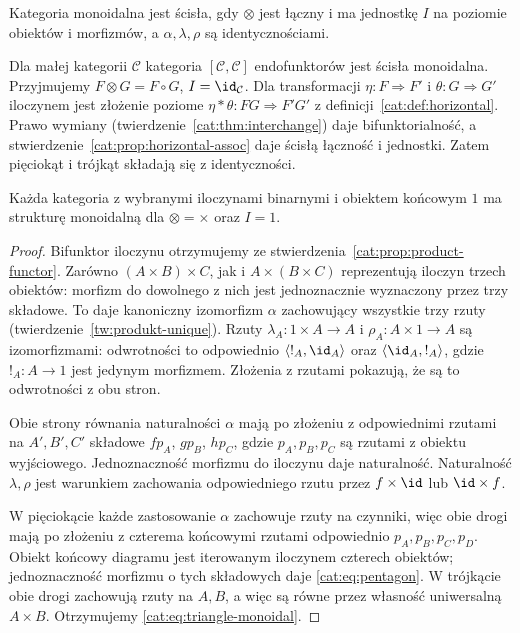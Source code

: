 \begin{definicja}\label{cat:def:strict-monoidal}
Kategoria monoidalna jest ścisła, gdy $\otimes$ jest łączny i ma jednostkę $I$ na poziomie obiektów i morfizmów, a $\alpha,\lambda,\rho$ są identycznościami.
\end{definicja}

\begin{przyklad}\label{cat:ex:endofunctor-monoidal}
Dla małej kategorii $\mathcal C$ kategoria $[\mathcal C,\mathcal C]$ endofunktorów jest ścisła monoidalna. Przyjmujemy $F\otimes G=F\circ G$, $I=\id_{\mathcal C}$. Dla transformacji $\eta:F\Rightarrow F'$ i $\theta:G\Rightarrow G'$ iloczynem jest złożenie poziome $\eta\ast\theta:FG\Rightarrow F'G'$ z definicji~\ref{cat:def:horizontal}. Prawo wymiany (twierdzenie~\ref{cat:thm:interchange}) daje bifunktorialność, a stwierdzenie~\ref{cat:prop:horizontal-assoc} daje ścisłą łączność i jednostki. Zatem pięciokąt i trójkąt składają się z identyczności.
\end{przyklad}

\begin{twierdzenie}\label{cat:thm:cartesian-monoidal}
Każda kategoria z wybranymi iloczynami binarnymi i obiektem końcowym $1$ ma strukturę monoidalną dla $\otimes=\times$ oraz $I=1$.
\end{twierdzenie}
\begin{proof}
Bifunktor iloczynu otrzymujemy ze stwierdzenia~\ref{cat:prop:product-functor}. Zarówno $(A\times B)\times C$, jak i $A\times(B\times C)$ reprezentują iloczyn trzech obiektów: morfizm do dowolnego z nich jest jednoznacznie wyznaczony przez trzy składowe. To daje kanoniczny izomorfizm $\alpha$ zachowujący wszystkie trzy rzuty (twierdzenie~\ref{tw:produkt-unique}). Rzuty $\lambda_A:1\times A\to A$ i $\rho_A:A\times1\to A$ są izomorfizmami: odwrotności to odpowiednio $\langle !_A,\id_A\rangle$ oraz $\langle\id_A,!_A\rangle$, gdzie $!_A:A\to1$ jest jedynym morfizmem. Złożenia z rzutami pokazują, że są to odwrotności z obu stron.

Obie strony równania naturalności $\alpha$ mają po złożeniu z odpowiednimi rzutami na $A',B',C'$ składowe $f p_A$, $g p_B$, $h p_C$, gdzie $p_A,p_B,p_C$ są rzutami z obiektu wyjściowego. Jednoznaczność morfizmu do iloczynu daje naturalność. Naturalność $\lambda,\rho$ jest warunkiem zachowania odpowiedniego rzutu przez $f\times\id$ lub $\id\times f$.

W pięciokącie każde zastosowanie $\alpha$ zachowuje rzuty na czynniki, więc obie drogi mają po złożeniu z czterema końcowymi rzutami odpowiednio $p_A,p_B,p_C,p_D$. Obiekt końcowy diagramu jest iterowanym iloczynem czterech obiektów; jednoznaczność morfizmu o tych składowych daje \eqref{cat:eq:pentagon}. W trójkącie obie drogi zachowują rzuty na $A,B$, a więc są równe przez własność uniwersalną $A\times B$. Otrzymujemy \eqref{cat:eq:triangle-monoidal}.
\end{proof}

